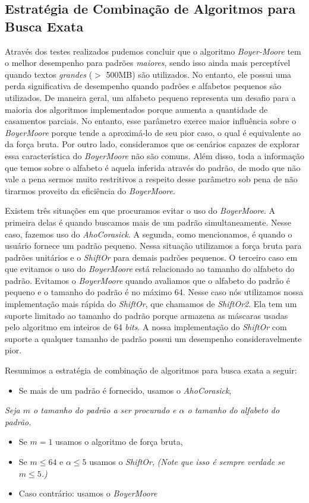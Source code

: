 \documentclass[]{article}
\begin{document}
\subsection{Estratégia de Combinação de Algoritmos para Busca Exata}
Através dos testes realizados pudemos concluir que o algoritmo \textit{Boyer-Moore} tem o melhor desempenho para padrões \textit{maiores}, sendo isso ainda mais perceptível quando textos \textit{grandes} ($>$ 500MB) são utilizados. No entanto, ele possui uma perda significativa de desempenho quando padrões e alfabetos pequenos são utilizados. De maneira geral, um alfabeto pequeno representa um desafio para a maioria dos algoritmos implementados porque aumenta a quantidade de casamentos parciais. No entanto, esse parâmetro exerce maior influência sobre o \textit{BoyerMoore} porque tende a aproximá-lo de seu pior caso, o qual é equivalente ao da força bruta. Por outro lado, consideramos que os cenários capazes de explorar essa característica do \textit{BoyerMoore} não são comuns. Além disso, toda a informação que temos sobre o alfabeto é aquela inferida através do padrão, de modo que não vale a pena sermos muito restritivos a respeito desse parâmetro sob pena de não tirarmos proveito da eficiência do \textit{BoyerMoore}.

Existem três situações em que procuramos evitar o uso do \textit{BoyerMoore}. A primeira delas é quando buscamos mais de um padrão simultaneamente. Nesse caso, fazemos uso do \textit{AhoCorasick}. A segunda, como mencionamos, é quando o usuário fornece um padrão pequeno. Nessa situação utilizamos a força bruta para padrões unitários e o \textit{ShiftOr} para demais padrões pequenos. O terceiro caso em que evitamos o uso do \textit{BoyerMoore} está relacionado ao tamanho do alfabeto do padrão. Evitamos o \textit{BoyerMoore} quando avaliamos que o alfabeto do padrão é pequeno e o tamanho do padrão é no máximo 64. Nesse caso nós utilizamos nossa implementação mais rápida do \textit{ShiftOr}, que chamamos de \textit{ShiftOr2}. Ela tem um suporte limitado ao tamanho do padrão porque armazena as máscaras usadas pelo algoritmo em inteiros de 64 \textit{bits}. A nossa implementação do \textit{ShiftOr} com suporte a qualquer tamanho de padrão possui um desempenho consideravelmente pior.

Resumimos a estratégia de combinação de algoritmos para busca exata a seguir:

\begin{itemize}
	\item Se mais de um padrão é fornecido, usamos o \textit{AhoCorasick},
\end{itemize}
\textit{Seja $m$ o tamanho do padrão a ser procurado e $\alpha$ o tamanho do alfabeto do padrão.}
\begin{itemize}
	\item Se $m = 1$ usamos o algoritmo de força bruta,
	\item Se $m \leq 64$ e $\alpha \leq 5$ usamos o \textit{ShiftOr}, \textit{(Note que isso é sempre verdade se $m \leq 5$.)}
	\item Caso contrário: usamos o \textit{BoyerMoore}
\end{itemize}
\end{document}
